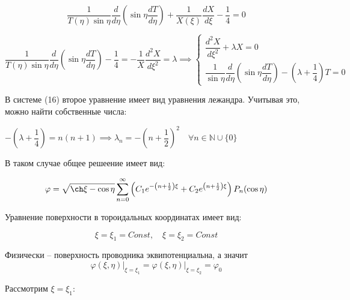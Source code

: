 \documentclass[a4paper,12pt]{article}
\begin{document}
	\begin{equation}
		\dfrac{1}{T(\eta)\sin\eta} \dfrac{d}{d\eta} \left(\sin\eta \dfrac{dT}{d\eta}\right) + \dfrac{1}{X(\xi)} \dfrac{dX}{d\xi} - \dfrac{1}{4} = 0
	\end{equation}
	
	\begin{equation}
		\dfrac{1}{T(\eta)\sin\eta} \dfrac{d}{d\eta} \left(\sin\eta\dfrac{dT}{d\eta}\right) - \dfrac{1}{4} = -\dfrac{1}{X} \dfrac{d^2 X}{d\xi^2} = \lambda \implies \begin{cases} 
			\dfrac{d^2 X}{d\xi^2} + \lambda X = 0 \\
			\dfrac{1}{\sin\eta} \dfrac{d}{d\eta}\left(\sin \eta \dfrac{dT}{d\eta} \right) - \left(\lambda + \dfrac{1}{4} \right) T = 0
		\end{cases}
	\end{equation}
	
	\quad В системе (16) второе уравнение имеет вид уравнения лежандра. Учитывая это, можно найти собственные числа:
	
	\begin{center}
		$-\left(\lambda + \dfrac{1}{4}\right) = n(n+1) \implies \lambda_n = -\left(n+\dfrac{1}{2}\right)^2 \quad \forall n \in \mathbb{N}\cup\{0\}$
	\end{center}
	
	\quad В таком случае общее решеение имеет вид:
	
	\begin{equation}
		\varphi = \sqrt{\ch\xi - \cos\eta} \displaystyle\sum\limits_{n=0}^{\infty} \left(C_1 e^{-\left(n+\frac{1}{2}\right)\xi} + C_2 e^{\left(n+\frac{1}{2}\right)\xi}\right)P_n(\cos\eta)
	\end{equation}
	
	\quad Уравнение поверхности в тороидальных координатах имеет вид:
	
	\begin{equation}
		\xi = \xi_1 = Const, \quad \xi = \xi_2 = Const 
	\end{equation}
	
	\quad Физически -- поверхность проводника эквипотенциальна, а значит 
	\begin{equation}
		\varphi(\xi, \eta)\bigg|_{\xi=\xi_1} = \varphi(\xi, \eta)\bigg|_{\xi = \xi_2} = \varphi_0
	\end{equation}
	
	\quad Рассмотрим $\xi = \xi_1$:
	
\end{document}
